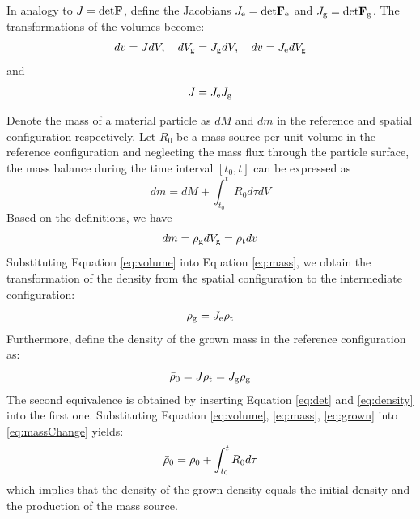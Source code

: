 In analogy to $J = \mathrm{det}\bold{F}$, define the Jacobians $J_{\mathrm{e}} = \mathrm{det}\bold{F}_\mathrm{e}$ and $J_{\mathrm{g}} = \mathrm{det}\bold{F}_\mathrm{g}$. The transformations of the volumes become:
\begin{equation} \label{eq:volume}
dv = JdV, \quad dV_{\mathrm{g}} = J_{\mathrm{g}} dV, \quad dv = J_{\mathrm{e}} dV_{\mathrm{g}}
\end{equation}
and
\begin{equation} \label{eq:det}
J = J_{\mathrm{e}} J_{\mathrm{g}}
\end{equation}

Denote the mass of a material particle as $dM$ and $dm$ in the reference and spatial configuration respectively. Let $R_0$ be a mass source per unit volume in the reference configuration and neglecting the mass flux through the particle surface, the mass balance during the time interval $[t_0, t]$ can be expressed as
\begin{equation} \label{eq:massChange}
dm = dM + \int_{t_0}^t R_0 d\tau dV
\end{equation}
Based on the definitions, we have
\begin{equation} \label{eq:mass}
dm = \rho_{\mathrm{g}} dV_{\mathrm{g}} = \rho_{\mathrm{t}} dv
\end{equation}
Substituting Equation \ref{eq:volume} into Equation \ref{eq:mass}, we obtain the transformation of the density from the spatial configuration to the intermediate configuration:
\begin{equation} \label{eq:density}
\rho_{\mathrm{g}} = J_{\mathrm{e}}\rho_{\mathrm{t}}
\end{equation}
Furthermore, define the density of the grown mass in the reference configuration as:
\begin{equation} \label{eq:grown}
\bar{\rho}_0 = J\rho_{\mathrm{t}} = J_{\mathrm{g}} \rho_{\mathrm{g}}
\end{equation}
The second equivalence is obtained by inserting Equation \ref{eq:det} and \ref{eq:density} into the first one. Substituting Equation \ref{eq:volume}, \ref{eq:mass}, \ref{eq:grown} into \ref{eq:massChange} yields:
\begin{equation} \label{eq:rhoBalance}
\bar{\rho}_0 = \rho_0 + \int_{t_0}^t R_0 d\tau
\end{equation}
which implies that the density of the grown density equals the initial density and the production of the mass source.

